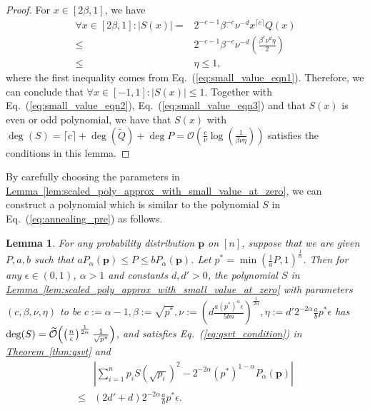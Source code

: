 \documentclass[journal]{IEEEtran}
\newtheorem{lemma}{Lemma}
\newcommand{\eq}[1]{Eq.~(\ref{eq:#1})}
\newcommand{\thm}[1]{\hyperref[thm:#1]{Theorem~\ref*{thm:#1}}}
\newcommand{\lem}[1]{\hyperref[lem:#1]{Lemma~\ref*{lem:#1}}}
\begin{document}
\begin{proof}
  For $x\in[2\beta,1]$, we have
  \begin{align}
    \forall x \in[2\beta,1]: |S(x)| = & 2^{-c-1}\beta^{-c}\nu^{-d}x^{\lceil c \rceil}Q(x)\nonumber \\
    \le& 2^{-c-1}\beta^{-c}\nu^{-d} (\frac{\beta^c\nu^d\eta}{2}) \nonumber \\\le& \eta \le 1,
  \end{align}
  where the first inequality comes from \eq{small_value_eqn1}. Therefore, we can conclude that $\forall x\in [-1,1]: |S(x)|\le 1$. Together with \eq{small_value_eqn2}, \eq{small_value_eqn3} and that $S(x)$ is even or odd polynomial, we have that $S(x)$ with $\deg(S) = \lceil c \rceil + \deg(\tilde{Q}) + \deg{P} = \mathcal{O}\left(\frac{c}{\nu}\log(\frac{1}{\beta\nu\eta})\right)$ satisfies the conditions in this lemma.
\end{proof}

By carefully choosing the parameters in \lem{scaled_poly_approx_with_small_value_at_zero}, we can construct a polynomial which is similar to the polynomial $S$ in \eq{annealing_pre} as follows.

\begin{lemma}
  \label{lem:polynomial_large_alpha}
  For any probability distribution $\mathbf{p}$ on $[n]$, suppose that we are given $P,a,b$ such that $a P_{\alpha}(\mathbf{p}) \le P \le b P_{\alpha}(\mathbf{p})$. Let $p^* = \min(\frac{1}{a}P,1)^{\frac{1}{\alpha}}$. Then for any $\epsilon \in (0,1)$, $\alpha > 1$ and constants $d,d' > 0$, the polynomial $S$ in \lem{scaled_poly_approx_with_small_value_at_zero} with parameters $(c,\beta,\nu,\eta)$ to be $c := \alpha-1,\beta := \sqrt{p^*}, \nu := \left(d\frac{a(p^*)^{\alpha}\epsilon}{5bn}\right)^{\frac{1}{2\alpha}}, \eta := d'2^{-2\alpha}\frac{a}{b}p^*\epsilon$ has $\deg(S) = \widetilde{\mathcal{O}}\Bigl(\left(\frac{n}{\epsilon}\right)^{\frac{1}{2\alpha}} \frac{1}{\sqrt{p^*}}\Bigr)$, and satisfies \eq{qsvt_condition} in \thm{qsvt} and
  \begin{align}
  \label{eq:approximation_large_alpha}
      &\left|\sum_{i=1}^n p_iS(\sqrt{p_i})^2 -2^{-2\alpha}(p^*)^{1-\alpha}P_{\alpha}(\mathbf{p})\right| \nonumber \\ \le & (2d'+d)2^{-2\alpha}\frac{a}{b}p^*\epsilon.
  \end{align}
\end{lemma}
\end{document}
